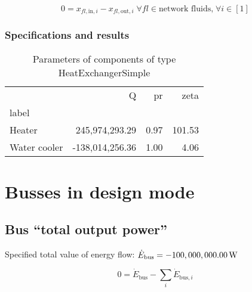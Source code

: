 \documentclass[]{article}
\begin{document}
\begin{equation}
\label{eq:HeatExchangerSimple_fluid_constraints}
0=x_{fl\mathrm{,in,}i}-x_{fl\mathrm{,out,}i}\;\forall fl \in\text{network fluids,}\; \forall i \in [1]
\end{equation}


\subsubsection{Specifications and results}

\begin{table}[H]
\centering
\caption{Parameters of components of type HeatExchangerSimple}
\begin{tabular}{lrrr}
\toprule
{} &                Q &    pr &    zeta \\
label        &                  &       &         \\
\midrule
Heater       &   245,974,293.29 &  0.97 &  101.53 \\
Water cooler &  -138,014,256.36 &  1.00 &    4.06 \\
\bottomrule
\end{tabular}
\end{table}
\section{Busses in design mode}

\subsection{Bus ``total output power''}

Specified total value of energy flow: $\dot{E}_\mathrm{bus} = \unit[-100,000,000.00]{W}$

\begin{equation}
\label{eq:Bus_energy_flow_sum}
0=\dot{E}_\mathrm{bus} -\sum_i \dot{E}_{\mathrm{bus,}i}
\end{equation}
\end{document}
